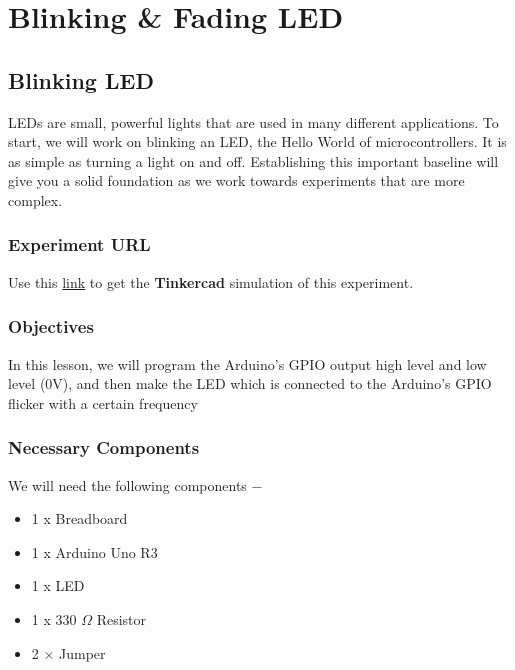 \pagebreak\section{Blinking \& Fading LED}

\subsection{Blinking LED}
LEDs are small, powerful lights that are used in many different applications. To start, we will work on blinking an LED, the Hello World of microcontrollers. It is as simple as turning a light on and off. Establishing this important baseline will give you a solid foundation as we work towards experiments that are more complex.

\subsubsection{Experiment URL}
     Use this \href{https://www.tinkercad.com/things/cJh2vPJHNMo?sharecode=pHXIFXpJnKTcQPuxdNKi-4YMURyigVNB9XbDgZYDrw8}{link} to get the \textbf{Tinkercad} simulation of this experiment.
    
\subsubsection{Objectives}
In this lesson, we will program the Arduino's GPIO output high level and low level (0V), and then make
the LED which is connected to the Arduino’s GPIO flicker with a certain frequency

\subsubsection{Necessary Components}
We will need the following components −
\begin{itemize}
    \item 1 x Breadboard
    \item 1 x Arduino Uno R3
    \item 1 x LED
    \item 1 x 330 $\Omega$ Resistor
    \item 2 × Jumper
\end{itemize}

